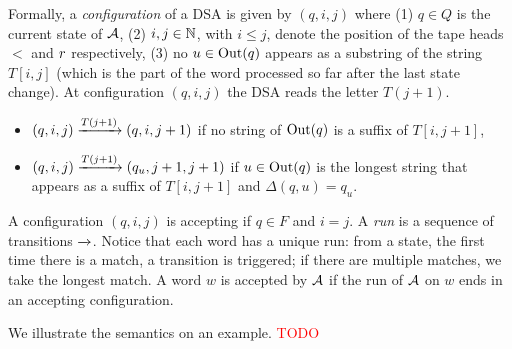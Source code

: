 Formally, a \emph{configuration} of a DSA is given by $(q, i, j)$ where (1) $q \in Q$ is the current state of $\mathcal{A}$, (2) $i, j \in \mathbb{N}$, with $i \le j$, denote the position of the tape heads $\lt$ and $r$ respectively, (3) no $u \in \operatorname{Out}(q)$ appears as a substring of the string $T[i, j]$ (which is the part of the word processed so far after the last state change). At configuration $(q, i, j)$ the DSA reads the letter $T(j+1)$.
\begin{itemize}
\item $(q, i, j) \xrightarrow{T(j+1)} (q, i, j+1)$ if no string of $\operatorname{Out}(q)$ is a suffix of $T[i, j+1]$,
\item $(q, i, j) \xrightarrow{T(j+1)} (q_u, j+1, j+1)$ if $u \in \operatorname{Out}(q)$ is the longest string that appears as a suffix of $T[i, j+1]$ and $\Delta(q, u) = q_u$. 
\end{itemize}
A configuration $(q, i, j)$ is accepting if $q \in F$ and $i = j$. A \emph{run} is a sequence of transitions $\xrightarrow{}$. Notice that each word has a unique run: from a state, the first time there is a match, a transition is triggered; if there are multiple matches, we take the longest match. A word $w$ is accepted by $\mathcal{A}$ if the run of $\mathcal{A}$ on $w$ ends in an accepting configuration.

We illustrate the semantics on an example. \textcolor{red}{TODO}

